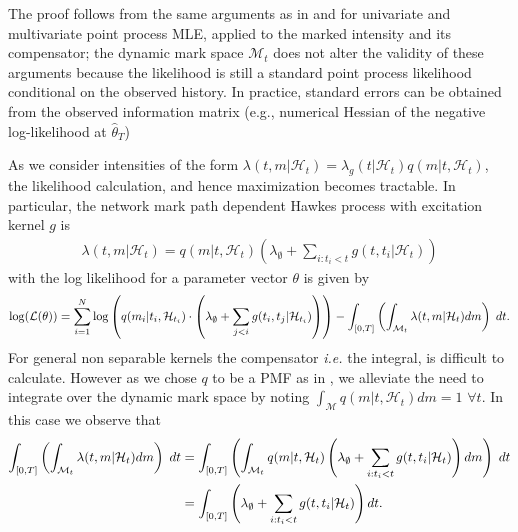 \documentclass[12pt]{article}
\begin{document}
The proof follows from the same arguments as in \citet{ogata1978estimators} and \citet{rathbun1996} for univariate and multivariate point process MLE, applied to the marked intensity and its compensator; the dynamic mark space $\mathcal M_t$ does not alter the validity of these arguments because the likelihood is still a standard point process likelihood conditional on the observed history. In practice, standard errors can be obtained from the observed information matrix (e.g., numerical Hessian of the negative log-likelihood at $\hat\theta_T$)

As we consider intensities of the form $
    \lambda(t,m\vert \mathcal{H}_t) = \lambda_{g}(t\vert \mathcal{H}_{t}) q(m\vert t,\mathcal{H}_{t}) 
    $, the likelihood calculation, and hence maximization becomes tractable. In particular, the network mark path dependent Hawkes process with excitation kernel $g$ is
\begin{align*}
    \lambda(t,m\vert \mathcal{H}_t) = q(m\vert t,\mathcal{H}_{t}) \left( \lambda_{\emptyset} + \sum_{i : t_{i} < t} g(t,t_i\vert \mathcal{H}_t) \right)
\end{align*}
with the log likelihood for a parameter vector $\theta$ is given by
\begin{align*}
\log(\mathcal{L}(\theta)) = \sum_{i = 1}^{N}\log \left(q(m_i \vert t_i, \mathcal{H}_{t_i}) \cdot\left( \lambda_{\emptyset} + \sum_{j<i} g(t_i,t_j \vert \mathcal{H}_{t_i}) \right)\right) - \int_{[0,T]}\left(\int_{\mathcal{M}_t}  \lambda(t,m|\mathcal{H}_t)  dm \right)\hspace{0.1cm} dt .
\end{align*}
For general non separable kernels the compensator \textit{i.e.} the integral, is difficult to calculate. However as we chose $q$ to be a PMF as in \cite{schoenberg_density_trick}, we alleviate the need to integrate over the dynamic mark space by noting $\int_{\mathcal{M}} q(m\vert t,\mathcal{H}_t)dm = 1$ $\forall t$. In this case we observe that
\begin{align*}
\int_{[0,T]}\left(\int_{\mathcal{M}_t}  \lambda(t,m|\mathcal{H}_t)  dm \right)\hspace{0.1cm} dt  &= \int_{[0,T]}\left(\int_{\mathcal{M}_t}  q(m\vert t,\mathcal{H}_{t}) \left( \lambda_{\emptyset} + \sum_{i : t_{i} < t} g(t,t_i\vert \mathcal{H}_t) \right)  dm \right)\hspace{0.1cm} dt \\
& = \int_{[0,T]}\left( \lambda_{\emptyset} + \sum_{i : t_{i} < t} g(t,t_i\vert \mathcal{H}_t) \right)   dt.
\end{align*}
\end{document}
